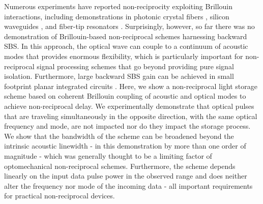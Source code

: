 \documentclass[superscriptaddress, nofootinbib, twocolumn, amsmath,amssymb, aps, pra, notitlepage, longbibliography]{revtex4-1}
\begin{document}
Numerous experiments have reported non-reciprocity exploiting Brillouin interactions, including demonstrations in photonic crystal fibers \cite{Kang2011}, silicon waveguides \cite{Kittlaus2018}, and fiber-tip resonators \cite{Kim2015, Dong2015, Kim2017a}. Surprisingly, however, so far there was no demonstration of Brillouin-based non-reciprocal schemes harnessing backward SBS. In this approach, the optical wave can couple to a continuum of acoustic modes that provides enormous flexibility, which is particularly important for non-reciprocal signal processing schemes that go beyond providing pure signal isolation. Furthermore, large backward SBS gain can be achieved in small footprint planar integrated circuits \cite{Eggleton2019}. \newline
Here, we show a non-reciprocal light storage scheme based on coherent Brillouin coupling of acoustic and optical modes to achieve non-reciprocal delay. We experimentally demonstrate that optical pulses that are traveling simultaneously in the opposite direction, with the same optical frequency and mode, are not impacted nor do they impact the storage process. We show that the bandwidth of the scheme can be broadened beyond the intrinsic acoustic linewidth - in this demonstration by more than one order of magnitude - which was generally thought to be a limiting factor of optomechanical non-reciprocal schemes. Furthermore, the scheme depends linearly on the input data pulse power in the observed range and does neither alter the frequency nor mode of the incoming data - all important requirements for practical non-reciprocal devices. \newline
%
\end{document}
